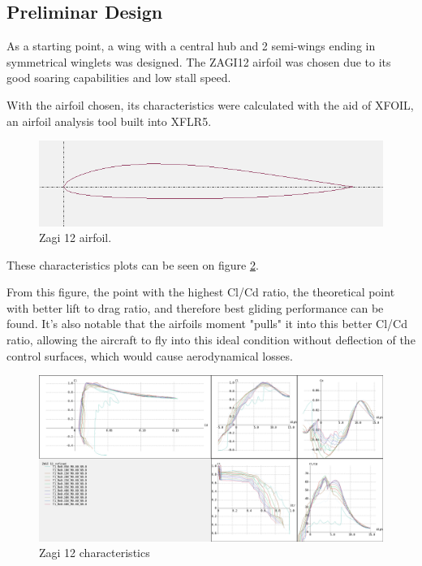 \subsection{Preliminar Design}

As a starting point, a wing with a central hub and 2 semi-wings ending in symmetrical winglets was designed. The ZAGI12 airfoil was chosen due to its good soaring capabilities and low stall speed.

With the airfoil chosen, its characteristics were calculated with the aid of XFOIL, an airfoil analysis tool built into XFLR5.

\begin{figure}[h]
\centering
  \includegraphics[width=\linewidth]{figs/zagi12.png}
  \caption{Zagi 12 airfoil.}
  \label{fig:zagi12}
\end{figure}


These characteristics plots can be seen on figure \ref{fig:zagi12polares}.
%

From this figure, the point with the highest Cl/Cd ratio, the theoretical point with better lift to drag ratio, and therefore best gliding performance can be found. It's also notable that the airfoils moment "pulls" it into this better Cl/Cd ratio, allowing the aircraft to fly into this ideal condition without deflection of the control surfaces, which would cause aerodynamical losses.


\begin{figure}
\centering
	  \includegraphics[width=\linewidth]{figs/polares.png}
  \caption{Zagi 12 characteristics}
  \label{fig:zagi12polares}
\end{figure}

